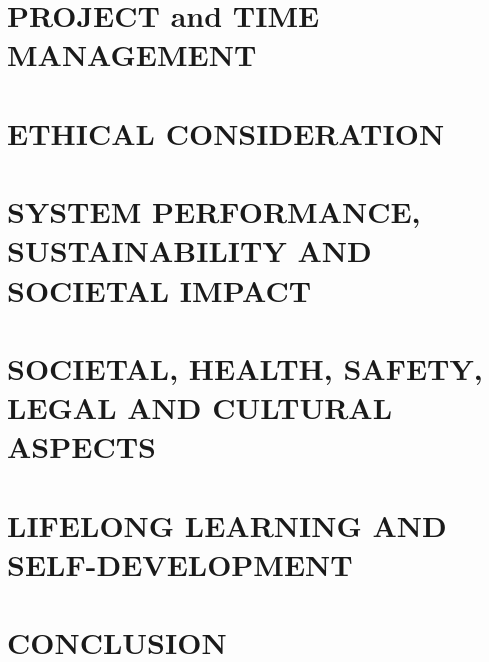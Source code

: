 \documentclass[12pt,a4paper]{report}
\begin{document}
\chapter{PROJECT and TIME MANAGEMENT}


\chapter{ETHICAL CONSIDERATION}


\chapter{SYSTEM PERFORMANCE, SUSTAINABILITY AND SOCIETAL IMPACT}


\chapter{SOCIETAL, HEALTH, SAFETY, LEGAL AND CULTURAL ASPECTS}


\chapter{LIFELONG LEARNING AND SELF-DEVELOPMENT}


\chapter{CONCLUSION}


\clearpage
\end{document}
